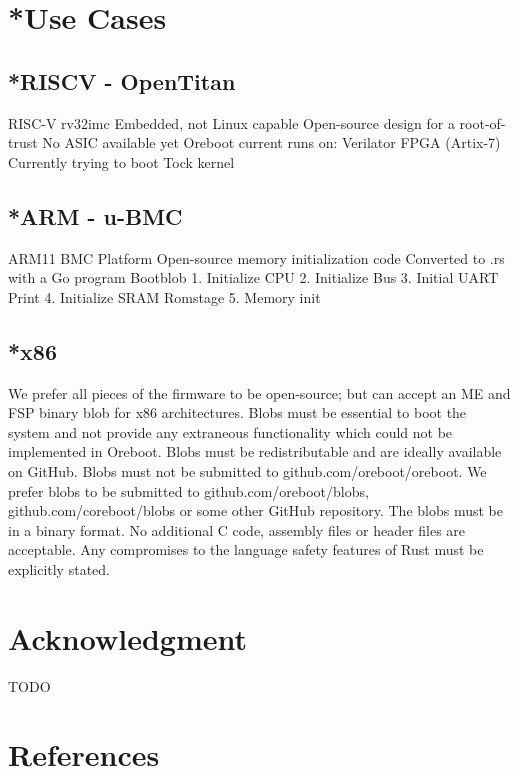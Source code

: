 \documentclass[conference]{IEEEtran}
\begin{document}
\section{*Use Cases}

\subsection{*RISCV - OpenTitan}

RISC-V rv32imc
Embedded, not Linux capable
Open-source design for a root-of-trust
No ASIC available yet
Oreboot current runs on:
Verilator
FPGA (Artix-7)
Currently trying to boot Tock kernel

\subsection{*ARM - u-BMC}

ARM11
BMC Platform
Open-source memory initialization code
Converted to .rs with a Go program
Bootblob
1. Initialize CPU
2. Initialize Bus
3. Initial UART Print
4. Initialize SRAM
Romstage
5. Memory init


\subsection{*x86}

We prefer all pieces of the firmware to be open-source; but can accept an ME and FSP binary blob for x86 architectures.
Blobs must be essential to boot the system and not provide any extraneous functionality which could not be implemented in Oreboot.
Blobs must be redistributable and are ideally available on GitHub.
Blobs must not be submitted to github.com/oreboot/oreboot. We prefer blobs to be submitted to github.com/oreboot/blobs, github.com/coreboot/blobs or some other GitHub repository.
The blobs must be in a binary format. No additional C code, assembly files or header files are acceptable.
Any compromises to the language safety features of Rust must be explicitly stated.


\section*{Acknowledgment}

TODO

\section*{References}




\vspace{12pt}
\end{document}
